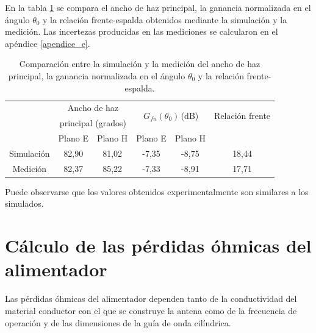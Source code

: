 En la tabla \ref{tabla_mediciones:3} se compara el ancho de haz principal, la ganancia normalizada en el ángulo $\theta_0$ y la relación frente-espalda obtenidos mediante la simulación y la medición. Las incertezas producidas en las mediciones se calcularon en el apéndice \ref{apendice_e}.
\begin{table}[H]
\centering
\begin{tabular}{c|c|c|cc|c|}
\cline{2-6}
& \multicolumn{2}{c|}{Ancho de haz} & \multicolumn{2}{c|}{\multirow{2}{*}{$G_{fn}\left(\theta_0\right)\,$(dB)}} & \multirow{2}{*}{Relación frente}\\
& \multicolumn{2}{c|}{principal (grados)} & & & \multirow{2}{*}{espalda (dB)}\\
\cline{2-5}
& Plano E & Plano H & \multicolumn{1}{|c|}{Plano E} & Plano H &\\
\hline
\multicolumn{1}{|c|}{Simulación} & 82,90 & 81,02 & \multicolumn{1}{|c|}{-7,35} & -8,75 & 18,44\\
\hline
\multicolumn{1}{|c|}{Medición} & 82,37 & 85,22 & \multicolumn{1}{|c|}{-7,33} & -8,91 & 17,71\\
\hline
\end{tabular}
\caption{Comparación entre la simulación y la medición del ancho de haz principal, la ganancia normalizada en el ángulo $\theta_0$ y la relación frente-espalda.}
\label{tabla_mediciones:3}
\end{table}
Puede observarse que los valores obtenidos experimentalmente son similares a los simulados.


\section{Cálculo de las pérdidas óhmicas del alimentador}
\label{sec_resultados_per_ohm_ali}

Las pérdidas óhmicas del alimentador dependen tanto de la conductividad del material conductor con el que se construye la antena como de la frecuencia de operación y de las dimensiones de la guía de onda cilíndrica.

